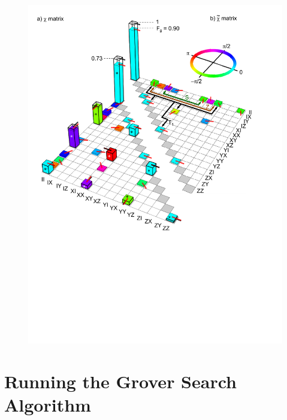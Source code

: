 \begin{figure}
	\centering
		\includegraphics[width=1.\textwidth]{./material/papers/iswap/figures/chi_matrix_and_error_process}
	\label{fig:GateChiMatrixAndErrorProcess}
	\caption{}
\end{figure}


\chapter{Running the Grover Search Algorithm}


